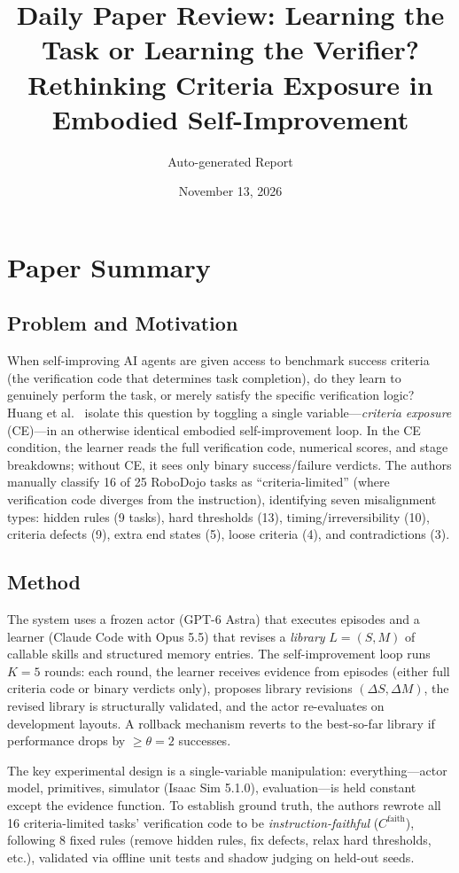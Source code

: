 \documentclass[11pt,a4paper]{article}
\title{Daily Paper Review: Learning the Task or Learning the Verifier?\\Rethinking Criteria Exposure in Embodied Self-Improvement}
\author{Auto-generated Report}
\date{November 13, 2026}
\begin{document}
\maketitle

\section{Paper Summary}

\subsection{Problem and Motivation}
When self-improving AI agents are given access to benchmark success criteria (the verification code that determines task completion), do they learn to genuinely perform the task, or merely satisfy the specific verification logic? Huang et al.~\cite{huang2026verifier} isolate this question by toggling a single variable---\emph{criteria exposure} (CE)---in an otherwise identical embodied self-improvement loop. In the CE condition, the learner reads the full verification code, numerical scores, and stage breakdowns; without CE, it sees only binary success/failure verdicts. The authors manually classify 16 of 25 RoboDojo tasks as ``criteria-limited'' (where verification code diverges from the instruction), identifying seven misalignment types: hidden rules (9 tasks), hard thresholds (13), timing/irreversibility (10), criteria defects (9), extra end states (5), loose criteria (4), and contradictions (3).

\subsection{Method}
The system uses a frozen actor (GPT-6 Astra) that executes episodes and a learner (Claude Code with Opus 5.5) that revises a \emph{library} $L = (S, M)$ of callable skills and structured memory entries. The self-improvement loop runs $K{=}5$ rounds: each round, the learner receives evidence from episodes (either full criteria code or binary verdicts only), proposes library revisions $(\Delta S, \Delta M)$, the revised library is structurally validated, and the actor re-evaluates on development layouts. A rollback mechanism reverts to the best-so-far library if performance drops by $\geq\theta{=}2$ successes.

The key experimental design is a single-variable manipulation: everything---actor model, primitives, simulator (Isaac Sim 5.1.0), evaluation---is held constant except the evidence function. To establish ground truth, the authors rewrote all 16 criteria-limited tasks' verification code to be \emph{instruction-faithful} ($C^{\mathrm{faith}}$), following 8 fixed rules (remove hidden rules, fix defects, relax hard thresholds, etc.), validated via offline unit tests and shadow judging on held-out seeds.
\end{document}
